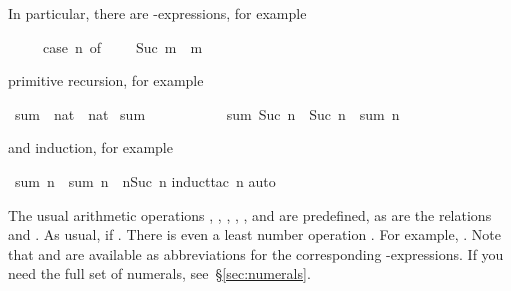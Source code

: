 %
\begin{isabellebody}%
\def\isabellecontext{natsum}%
%
\begin{isamarkuptext}%
\noindent
In particular, there are -expressions, for example
\begin{isabelle}%
\ \ \ \ \ case\ n\ of\ {}\ {\isasymRightarrow}\ {}\ {\isacharbar}\ Suc\ m\ {\isasymRightarrow}\ m%
\end{isabelle}
primitive recursion, for example%
\end{isamarkuptext}%
\ sum\ {\isacharcolon}{\isacharcolon}\ {\isachardoublequote}nat\ {\isasymRightarrow}\ nat{\isachardoublequote}\isanewline
{}\ {\isachardoublequote}sum\ {}\ {\isacharequal}\ {}{\isachardoublequote}\isanewline
\ \ \ \ \ \ \ \ {\isachardoublequote}sum\ {\isacharparenleft}Suc\ n{\isacharparenright}\ {\isacharequal}\ Suc\ n\ {\isacharplus}\ sum\ n{\isachardoublequote}%
\begin{isamarkuptext}%
\noindent
and induction, for example%
\end{isamarkuptext}%
\ {\isachardoublequote}sum\ n\ {\isacharplus}\ sum\ n\ {\isacharequal}\ n{\isacharasterisk}{\isacharparenleft}Suc\ n{\isacharparenright}{\isachardoublequote}\isanewline
{}induct{\isacharunderscore}tac\ n{\isacharparenright}\isanewline
{}auto{\isacharparenright}\isanewline
{}%
\begin{isamarkuptext}%
\newcommand{\mystar}{*%
}
%
The usual arithmetic operations ,
, \ttindexboldpos{\mystar}{$HOL2arithfun},
, ,  and
 are predefined, as are the relations
 and
. As usual,  if
. There is even a least number operation
\@.  For example, . 
Note that 
and  are available as abbreviations for the corresponding
-expressions. If you need the full set of numerals,
see~\S\ref{sec:numerals}.


\end{isamarkuptext}
\end{isabellebody}
